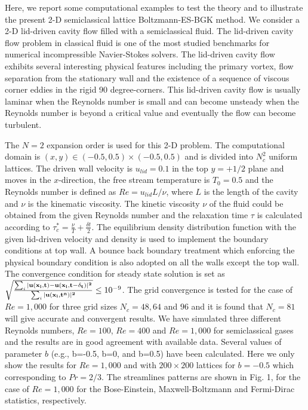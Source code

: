 \documentclass[doublecol]{epl2}
\begin{document}
Here, we report some computational examples to test the theory and to illustrate the present 2-D semiclassical lattice Boltzmann-ES-BGK method. We consider a 2-D lid-driven cavity flow filled with a semiclassical fluid. The lid-driven cavity flow problem in classical fluid is one of the most studied benchmarks for numerical incompressible Navier-Stokes solvers.  The lid-driven cavity flow exhibits several interesting physical features including the primary vortex, flow separation from the stationary wall and the existence of a sequence of viscous corner eddies in the rigid 90 degree-corners. This lid-driven cavity flow is usually laminar when the Reynolds number is small and can become unsteady when the Reynolds number is beyond a critical value and eventually the flow can become turbulent.

The $N=2$ expansion order is used for this 2-D problem. The computational domain is $(x,y) \in  (-0.5,0.5)\times(-0.5,0.5)$ and is divided into $N_c^2$ uniform lattices.   The driven wall velocity is $u_{lid}=0.1$ in the top $y=+1/2$ plane and moves in the $x$-direction, the free stream temperature is $T_{0}=0.5$ and the Reynolds number is defined as $Re =u_{lid} L/\nu$, where $L$ is the length of the cavity and $\nu$ is the kinematic viscosity.   The kinetic viscosity $\nu$ of the fluid could be obtained from the given Reynolds number and the relaxation time $\tau$ is calculated according to $\tau_c^* =\frac{\nu}{T}+\frac{\delta t}{2}$.  The equilibrium density distribution function with the given lid-driven velocity and density is used to implement the boundary conditions at top wall.  A bounce back boundary treatment which enforcing the physical boundary condition is also adopted on all the walls except the top wall.
The convergence condition for steady state solution is set as $ \sqrt{ \frac{ \sum_i |\bf{u} (\bf{x}_i, t)-\bf{u} (\bf{x}_i, t-\delta_t)|^2}{\sum_i |\bf{u} (\bf{x}_i, t^n)|^2 } } \leq 10^{-9}$.
The grid convergence is tested for the case of $Re=1,000$ for three grid sizes $N_c=48, 64$ and $96$ and it is found that $N_c=81$ will give accurate and convergent results.  We have simulated three different Reynolds numbers, $Re=100$, $Re=400$ and $Re=1,000$ for semiclassical gases and the results are in good agreement with available data.  Several values of parameter $b$ (e.g., b=-0.5, b=0, and b=0.5) have been calculated. Here we only show the results for $Re=1,000$ and with $200 \times 200$ lattices for $b=-0.5$ which corresponding to $Pr=2/3$.
The streamlines patterns are shown in Fig. 1, for the case of $Re=1,000$ for the Bose-Einstein, Maxwell-Boltzmann and Fermi-Dirac statistics, respectively.
\end{document}
